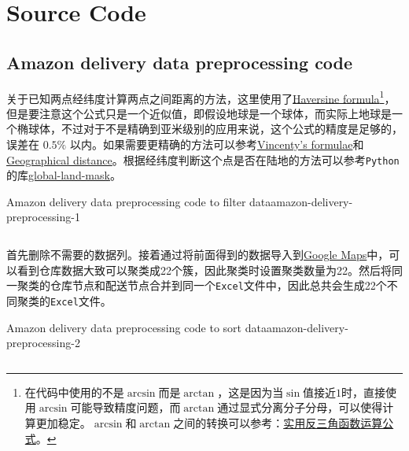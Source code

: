 \chapter{Source Code}

\section{Amazon delivery data preprocessing code}\label{sec:amazon-delivery-data-preprocessing-code}
关于已知两点经纬度计算两点之间距离的方法，这里使用了\href{https://www.wikiwand.com/en/articles/Haversine_formula}{Haversine formula}\footnote{在代码中使用的不是$\arcsin$而是$\arctan$，这是因为当$\sin$值接近$1$时，直接使用$\arcsin$可能导致精度问题，而$\arctan$通过显式分离分子分母，可以使得计算更加稳定。$\arcsin$和$\arctan$之间的转换可以参考：\href{https://zhuanlan.zhihu.com/p/111197233}{实用反三角函数运算公式}。}，但是要注意这个公式只是一个近似值，即假设地球是一个球体，而实际上地球是一个椭球体，不过对于不是精确到亚米级别的应用来说，这个公式的精度是足够的，误差在 $0.5\%$ 以内。如果需要更精确的方法可以参考\href{https://www.wikiwand.com/en/articles/Vincenty%27s_formulae}{Vincenty's formulae}和\href{https://www.wikiwand.com/en/articles/Geographical_distance}{Geographical distance}。根据经纬度判断这个点是否在陆地的方法可以参考\texttt{Python}的库\href{https://pypi.org/project/global-land-mask/}{global-land-mask}。

\begin{code}{Amazon delivery data preprocessing code to filter data}{amazon-delivery-preprocessing-1}
    \inputminted[highlightlines={5-13,44-48,3}]{python}{code/amazon_delivery/amazon_delivery_preprocessing_1.py}
\end{code}

首先删除不需要的数据列。接着通过将前面得到的数据导入到\href{https://www.google.com/maps/d/}{Google Maps}中，可以看到仓库数据大致可以聚类成22个簇，因此聚类时设置聚类数量为22。然后将同一聚类的仓库节点和配送节点合并到同一个\texttt{Excel}文件中，因此总共会生成22个不同聚类的\texttt{Excel}文件。

\begin{code}{Amazon delivery data preprocessing code to sort data}{amazon-delivery-preprocessing-2}
\inputminted{python}{code/amazon_delivery/amazon_delivery_preprocessing_2.py}
\end{code}

